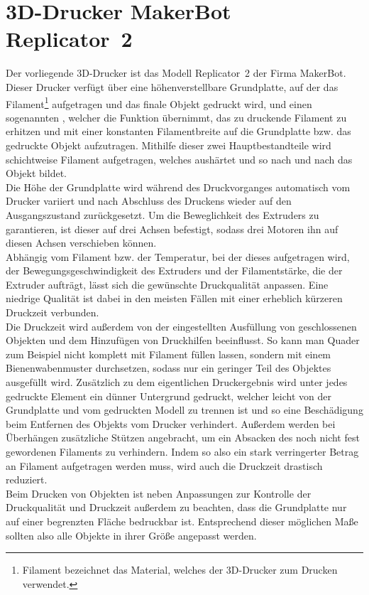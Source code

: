 \section{3D-Drucker MakerBot Replicator\texttrademark\ 2}
Der vorliegende 3D-Drucker ist das Modell Replicator\texttrademark\ 2 der Firma MakerBot.
Dieser Drucker verfügt über eine höhenverstellbare Grundplatte, auf der das Filament\footnote{Filament bezeichnet das Material, welches der 3D-Drucker zum Drucken verwendet.} aufgetragen und das finale Objekt gedruckt wird, und einen sogenannten , welcher die Funktion übernimmt, das zu druckende Filament zu erhitzen und mit einer konstanten Filamentbreite auf die Grundplatte bzw. das gedruckte Objekt aufzutragen. 
Mithilfe dieser zwei Hauptbestandteile wird schichtweise Filament aufgetragen, welches aushärtet und so nach und nach das Objekt bildet. \\
Die Höhe der Grundplatte wird während des Druckvorganges automatisch vom Drucker variiert und nach Abschluss des Druckens wieder auf den Ausgangszustand zurückgesetzt.
Um die Beweglichkeit des Extruders zu garantieren, ist dieser auf drei Achsen befestigt, sodass drei Motoren ihn auf diesen Achsen verschieben können. \\
Abhängig vom Filament bzw. der Temperatur, bei der dieses aufgetragen wird, der Bewegungsgeschwindigkeit des Extruders und der Filamentstärke, die der Extruder aufträgt, lässt sich die gewünschte Druckqualität anpassen.
Eine niedrige Qualität ist dabei in den meisten Fällen mit einer erheblich kürzeren Druckzeit verbunden. \\
Die Druckzeit wird außerdem von der eingestellten Ausfüllung von geschlossenen Objekten und dem Hinzufügen von Druckhilfen beeinflusst.
So kann man Quader zum Beispiel nicht komplett mit Filament füllen lassen, sondern mit einem Bienenwabenmuster durchsetzen, sodass nur ein geringer Teil des Objektes ausgefüllt wird.
Zusätzlich zu dem eigentlichen Druckergebnis wird unter jedes gedruckte Element ein dünner Untergrund gedruckt, welcher leicht von der Grundplatte und vom gedruckten Modell zu trennen ist und so eine Beschädigung beim Entfernen des Objekts vom Drucker verhindert.
Außerdem werden bei Überhängen zusätzliche Stützen angebracht, um ein Absacken des noch nicht fest gewordenen Filaments zu verhindern. 
Indem so also ein stark verringerter Betrag an Filament aufgetragen werden muss, wird auch die Druckzeit drastisch reduziert. \\
Beim Drucken von Objekten ist neben Anpassungen zur Kontrolle der Druckqualität und Druckzeit außerdem zu beachten, dass die Grundplatte nur auf einer begrenzten Fläche bedruckbar ist.
Entsprechend dieser möglichen Maße sollten also alle Objekte in ihrer Größe angepasst werden.
